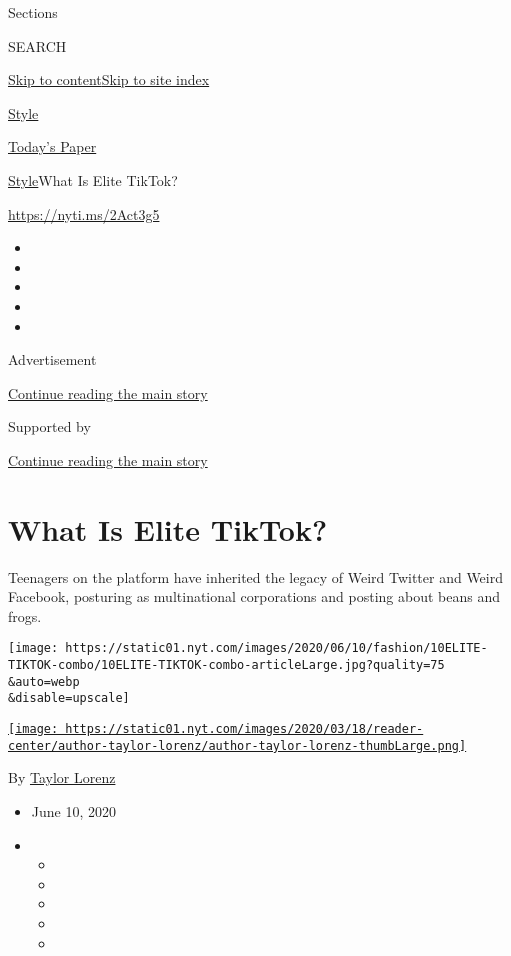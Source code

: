 Sections

SEARCH

\protect\hyperlink{site-content}{Skip to
content}\protect\hyperlink{site-index}{Skip to site index}

\href{https://www.nytimes.com/section/style}{Style}

\href{https://myaccount.nytimes.com/auth/login?response_type=cookie\&client_id=vi}{}

\href{https://www.nytimes.com/section/todayspaper}{Today's Paper}

\href{/section/style}{Style}\textbar{}What Is Elite TikTok?

\url{https://nyti.ms/2Act3g5}

\begin{itemize}
\item
\item
\item
\item
\item
\end{itemize}

Advertisement

\protect\hyperlink{after-top}{Continue reading the main story}

Supported by

\protect\hyperlink{after-sponsor}{Continue reading the main story}

\hypertarget{what-is-elite-tiktok}{%
\section{What Is Elite TikTok?}\label{what-is-elite-tiktok}}

Teenagers on the platform have inherited the legacy of Weird Twitter and
Weird Facebook, posturing as multinational corporations and posting
about beans and frogs.

\texttt{[image: https://static01.nyt.com/images/2020/06/10/fashion/10ELITE-TIKTOK-combo/10ELITE-TIKTOK-combo-articleLarge.jpg?quality=75\\\&auto=webp\\\&disable=upscale]}

\href{https://www.nytimes.com/by/taylor-lorenz}{\texttt{[image: https://static01.nyt.com/images/2020/03/18/reader-center/author-taylor-lorenz/author-taylor-lorenz-thumbLarge.png]}}

By \href{https://www.nytimes.com/by/taylor-lorenz}{Taylor Lorenz}

\begin{itemize}
\item
  June 10, 2020
\item
  \begin{itemize}
  \item
  \item
  \item
  \item
  \item
  \end{itemize}
\end{itemize}

